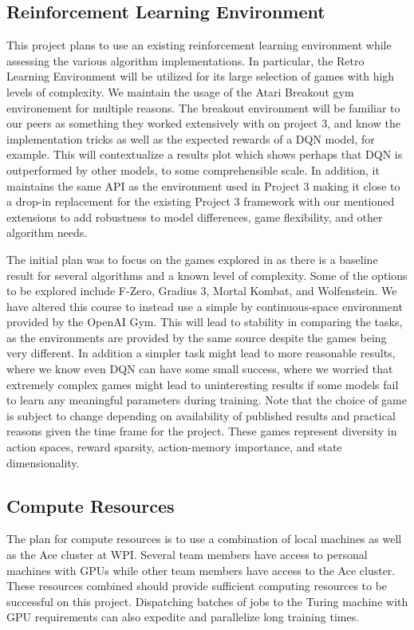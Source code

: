 \documentclass[conference]{IEEEtran}
\begin{document}
\subsection{Reinforcement Learning Environment}
This project plans to use an existing reinforcement learning environment while assessing the various algorithm implementations.
In particular, the Retro Learning Environment \cite{nichol2018retro} will be utilized for its large selection of games with high levels of complexity.
We maintain the usage of the Atari Breakout gym environement for multiple reasons. The breakout environment will be familiar to our peers as something they worked extensively with on project 3, and know the implementation tricks as well as the expected rewards of a DQN model, for example. This will contextualize a results plot which shows perhaps that DQN is outperformed by other models, to some comprehensible scale.
In addition, it maintains the same API as the environment used in Project 3 making it close to a drop-in replacement for the existing Project 3 framework with our mentioned extensions to add robustness to model differences, game flexibility, and other algorithm needs.

The initial plan was to focus on the games explored in \cite{bhonker2017playing} as there is a baseline result for several algorithms and a known level of complexity.
Some of the options to be explored include F-Zero, Gradius 3, Mortal Kombat, and Wolfenstein.
We have altered this course to instead use a simple by continuous-space environment provided by the OpenAI Gym. This will lead to stability in comparing the tasks, as the environments are provided by the same source despite the games being very different. In addition a simpler task might lead to more reasonable results, where we know even DQN can have some small success, where we worried that extremely complex games might lead to uninteresting results if some models fail to learn any meaningful parameters during training.
Note that the choice of game is subject to change depending on availability of published results and practical reasons given the time frame for the project.
These games represent diversity in action spaces, reward sparsity, action-memory importance, and state dimensionality.

\subsection{Compute Resources}
The plan for compute resources is to use a combination of local machines as well as the Ace cluster at WPI.
Several team members have access to personal machines with GPUs while other team members have access to the Ace cluster.
These resources combined should provide sufficient computing resources to be successful on this project.
Dispatching batches of jobs to the Turing machine with GPU requirements can also expedite and parallelize long training times.
\end{document}
